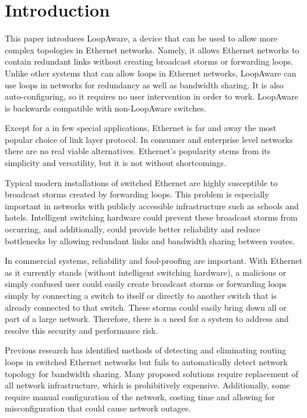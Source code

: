 \section{Introduction}
\label{sec:introduction}
	This paper introduces LoopAware, a device that can be used to allow more complex topologies in Ethernet networks.
	Namely, it allows Ethernet networks to contain redundant links without creating broadcast storms or forwarding loops.
	Unlike other systems that can allow loops in Ethernet networks, LoopAware can use loops in networks for redundancy as well as bandwidth sharing.
	It is also auto-configuring, so it requires no user intervention in order to work.
	LoopAware is backwards compatible with non-LoopAware switches.
	
	Except for a in few special applications, Ethernet is far and away the most popular choice of link layer protocol.
	In consumer and enterprise level networks there are no real viable alternatives.
	Ethernet's popularity stems from its simplicity and versatility, but it is not without shortcomings.

	Typical modern installations of switched Ethernet are highly susceptible to broadcast storms created by forwarding loops.
	This problem is especially important in networks with publicly accessible infrastructure such as schools and hotels.
	Intelligent switching hardware could prevent these broadcast storms from occurring, and additionally, could provide better reliability and reduce bottlenecks by allowing redundant links and bandwidth sharing between routes.

	In commercial systems, reliability and fool-proofing are important.
	With Ethernet as it currently stands (without intelligent switching hardware), a malicious or simply confused user could easily create broadcast storms or forwarding loops simply by connecting a switch to itself or directly to another switch that is already connected to that switch.
	These storms could easily bring down all or part of a large network.
	Therefore, there is a need for a system to address and resolve this security and performance risk.
	
	Previous research has identified methods of detecting and eliminating routing loops in switched Ethernet networks but fails to automatically detect network topology for bandwidth sharing.
	Many proposed solutions require replacement of all network infrastructure, which is prohibitively expensive.
	Additionally, some require manual configuration of the network, costing time and allowing for misconfiguration that could cause network outages.

